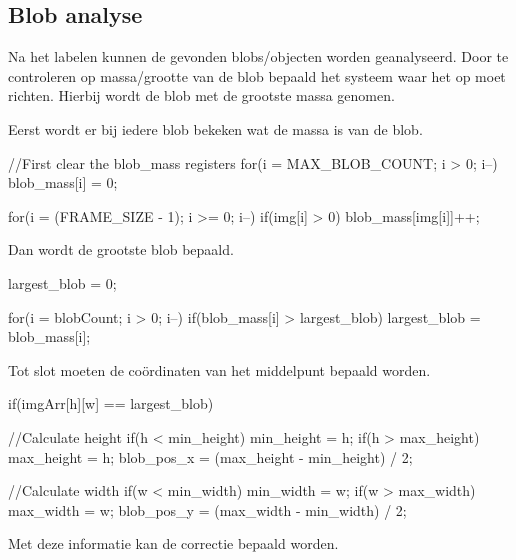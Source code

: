 \subsection{Blob analyse}

Na het labelen kunnen de gevonden blobs/objecten worden geanalyseerd. Door
te controleren op massa/grootte van de blob bepaald het systeem waar het op
moet richten. Hierbij wordt de blob met de grootste massa genomen.

Eerst wordt er bij iedere blob bekeken wat de massa is van de blob.

\begin{cppcode}
//First clear the blob_mass registers
for(i = MAX_BLOB_COUNT; i > 0; i--){
    blob_mass[i] = 0;
}

for(i = (FRAME_SIZE - 1); i >= 0; i--){
    if(img[i] > 0){
        blob_mass[img[i]]++;
    }
}
\end{cppcode}

Dan wordt de grootste blob bepaald.

\begin{cppcode}
largest_blob = 0;

for(i = blobCount; i > 0; i--){
    if(blob_mass[i] > largest_blob){
        largest_blob = blob_mass[i];
    }
}
\end{cppcode}

Tot slot moeten de coördinaten van het middelpunt bepaald worden.

\begin{cppcode}
if(imgArr[h][w] == largest_blob){
    //Calculate height
    if(h < min_height){
        min_height = h;
    }
    if(h > max_height){
        max_height = h;
    }
    blob_pos_x = (max_height - min_height) / 2;

    //Calculate width
    if(w < min_width){
        min_width = w;
    }
    if(w > max_width){
        max_width = w;
    }
    blob_pos_y = (max_width - min_width) / 2;
}
\end{cppcode}

Met deze informatie kan de correctie bepaald worden.
